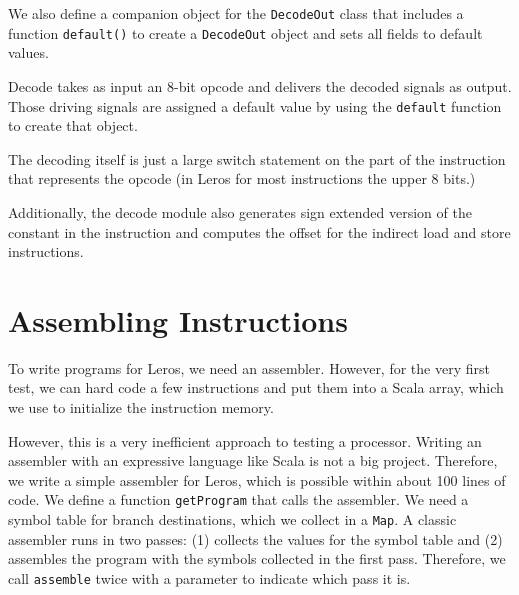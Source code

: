 \documentclass[%
    10pt,
    headinclude, footexclude,
    openright, %
    notitlepage,
    cleardoubleempty,
    headsepline,
    pointlessnumbers,
    bibtotoc, idxtotoc,
    ]{scrbook}
\newcommand{\code}[1]{{\lstinline[basicstyle=\small\ttfamily]{#1}}}
\newcommand{\todo}[1]{{\emph{TODO: #1}}}
\renewcommand{\todo}[1]{}
\begin{document}

\noindent We also define a companion object for the \code{DecodeOut} class that includes a
function \code{default()} to create a \code{DecodeOut} object and sets all fields to
default values.
 

\noindent Decode takes as input an 8-bit opcode and delivers the decoded signals
as output. Those driving signals are assigned a default value by using the \code{default}
function to create that object.


\noindent The decoding itself is just a large switch statement on the part of the
instruction that represents the opcode (in Leros for most instructions the upper
8 bits.)


Additionally, the decode module also generates sign extended version of the
constant in the instruction and computes the offset for the indirect load and
store instructions.

\todo{there is more on decoding}
\todo{and the whole execution is missing}

\section{Assembling Instructions}


To write programs for Leros, we need an assembler. However, for the very first
test, we can hard code a few instructions and put them into a Scala array,
which we use to initialize the instruction memory.


\noindent However, this is a very inefficient approach to testing a processor.
Writing an assembler with an expressive language like Scala is not a big project.
Therefore, we write a simple assembler for Leros, which is possible within about
100 lines of code. We define a function \code{getProgram} that calls the assembler.
We need a symbol table for branch destinations, which we collect in a \code{Map}.
A classic assembler runs in two passes: (1) collects the values for the symbol table
and (2) assembles the program with the symbols collected in the first pass.
Therefore, we call \code{assemble} twice with a parameter to indicate which pass it is.
\end{document}

